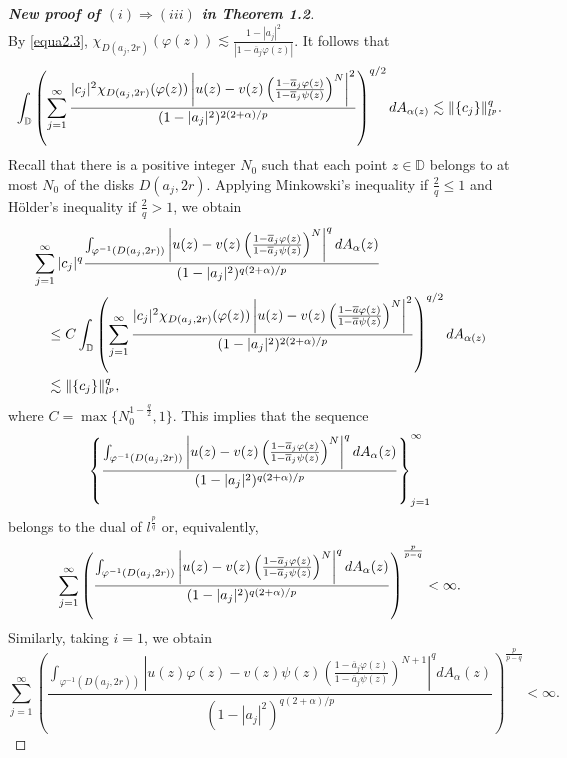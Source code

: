 \documentclass[10pt,a4paper]{amsart}
\begin{document}
\begin{proof}[{\bf New proof of $(i)\Rightarrow (iii)$ in Theorem 1.2}]
\begin{equation*}
\end{equation*}
By \eqref{equa2.3}, $\chi_{D(a_j,2r)}(\varphi(z))\lesssim \frac{1-|a_j|^2}{|1-\overline{a}_j\varphi(z)|}$. It follows that
\begin{equation*}
\begin{split}
\int_{\mathbb{D}}\left(\sum_{j=1}^{\infty}\frac{|c_j|^2\chi_{D(a_j,2r)}(\varphi(z))\left|u(z)-v(z)\left(\frac{1-\overline{a}_j\varphi(z)}{1-\overline{a}_j\psi(z)}\right)^N\right|^2}{(1-|a_j|^2)^{2(2+\alpha)/p}}\right)^{q/2}{\rm d}A_{\alpha(z)} \lesssim \|\{c_j\}\|_{l^p}^q.
\end{split}
\end{equation*}
Recall that there is a positive integer $N_0$ such that each point $z\in\mathbb{D}$ belongs to at most $N_0$ of the disks $D(a_j,2r)$. Applying Minkowski's inequality if $\frac{2}{q}\leq 1$ and H\"older's inequality if $\frac{2}{q}>1$, we obtain
\begin{equation*}
\begin{split}
&\sum_{j=1}^{\infty}|c_j|^q\frac{\int_{\varphi^{-1}(D(a_j,2r))}\left|u(z)-v(z)\left(\frac{1-\overline{a}_j\varphi(z)}{1-\overline{a}_j\psi(z)}\right)^N\right|^q{\rm d}A_{\alpha}(z)}{(1-|a_j|^2)^{q(2+\alpha)/p}}\\
&\quad\leq C\int_{\mathbb{D}}\left(\sum_{j=1}^{\infty}\frac{|c_j|^2\chi_{D(a_j,2r)}(\varphi(z))\left|u(z)-v(z)\left(\frac{1-\overline{a}\varphi(z)}{1-\overline{a}\psi(z)}\right)^N\right|^2}{(1-|a_j|^2)^{2(2+\alpha)/p}}\right)^{q/2}{\rm d}A_{\alpha(z)}\\
&\quad \lesssim \|\{c_j\}\|_{l^p}^q,
\end{split}
\end{equation*}
where $C=\max\{N_0^{1-\frac{q}{2}},1\}$. This implies that the sequence 
\[\left\{\frac{\int_{\varphi^{-1}(D(a_j,2r))}\left|u(z)-v(z)\left(\frac{1-\overline{a}_j\varphi(z)}{1-\overline{a}_j\psi(z)}\right)^N\right|^q{\rm d}A_{\alpha}(z)}{(1-|a_j|^2)^{q(2+\alpha)/p}}\right\}_{j=1}^{\infty}\]
belongs to the dual of $l^{\frac{p}{q}}$ or, equivalently,
\begin{equation}\label{equa3.7}
\sum_{j=1}^{\infty}\left(\frac{\int_{\varphi^{-1}(D(a_j,2r))}\left|u(z)-v(z)\left(\frac{1-\overline{a}_j\varphi(z)}{1-\overline{a}_j\psi(z)}\right)^N\right|^q{\rm d}A_{\alpha}(z)}{(1-|a_j|^2)^{q(2+\alpha)/p}}\right)^{\frac{p}{p-q}}<\infty.
\end{equation}
Similarly, taking $i=1$, we obtain
\begin{equation}\label{equa3.8}
\sum_{j=1}^{\infty}\left(\frac{\int_{\varphi^{-1}(D(a_j,2r))}\left|u(z)\varphi(z)-v(z)\psi(z)\left(\frac{1-\overline{a}_j\varphi(z)}{1-\overline{a}_j\psi(z)}\right)^{N+1}\right|^qdA_{\alpha}(z)}{(1-|a_j|^2)^{q(2+\alpha)/p}}\right)^{\frac{p}{p-q}}<\infty.

\end{equation}
\end{proof}
\end{document}
